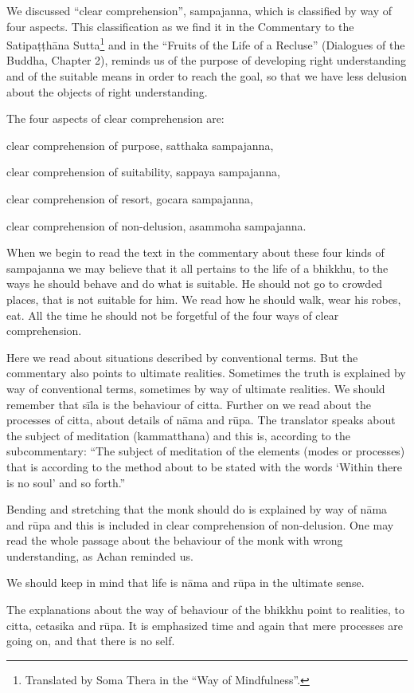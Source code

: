 We discussed ``clear comprehension'', sampajanna, which is classified by way of four 
aspects. This classification as we find it in the Commentary to the Satipaṭṭhāna 
Sutta\footnote{Translated by Soma Thera in the ``Way of Mindfulness''. } and in the ``Fruits of the Life of a Recluse'' (Dialogues of the Buddha, Chapter 
2), reminds us of the purpose of developing right understanding and of the suitable 
means in order to reach the goal, so that we have less delusion about the objects of 
right understanding. 

The four aspects of clear comprehension are: 

clear comprehension of purpose, satthaka sampajanna, 

clear comprehension of suitability, sappaya sampajanna, 

clear comprehension of resort, gocara sampajanna, 

clear comprehension of non-delusion, asammoha sampajanna. 

When we begin to read the text in the commentary about these four kinds of sampajanna we may believe that it all pertains to the life of a bhikkhu, to the ways he 
should behave and do what is suitable. He should not go to crowded places, that is 
not suitable for him. We read how he should walk, wear his robes, eat. All the time 
he should not be forgetful of the four ways of clear comprehension. 

Here we read about situations described by conventional terms. But the commentary 
also points to ultimate realities. Sometimes the truth is explained by way of conventional terms, sometimes by way of ultimate realities. We should remember that sīla is 
the behaviour of citta. Further on we read about the processes of citta, about details of 
nāma and rūpa. The translator speaks about the subject of meditation (kammatthana) 
and this is, according to the subcommentary: ``The subject of meditation of the elements (modes or processes) that is according to the method about to be stated with 
the words ‘Within there is no soul’ and so forth.'' 


Bending and stretching that the monk should do is explained by way of nāma and 
rūpa and this is included in clear comprehension of non-delusion. One may read the 
whole passage about the behaviour of the monk with wrong understanding, as  Achan 
reminded us. 

We should keep in mind that life is nāma and rūpa in the ultimate sense. 

The explanations about the way of behaviour of the bhikkhu point to realities, to citta, 
cetasika and rūpa. It is emphasized time and again that mere processes are going on, 
and that there is no self. 

